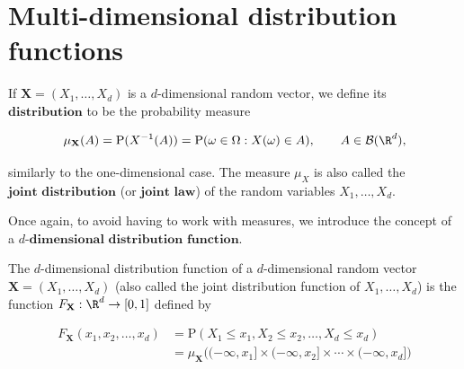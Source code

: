 \section{Multi-dimensional distribution functions}

If $\mathbf{X}=(X_1,\ldots,X_d)$ is a $d$-dimensional
random vector, we define its $\textbf{distribution}$
to be the probability measure

\[
\mu_{\mathbf{X}}(A) = \mathrm{P}(X^{-1}(A)) = \mathrm{P}(\omega \in \Omega : X(\omega) \in A),
\qquad A \in {\cal B}(\R^d),
\]

\noindent similarly to the one-dimensional case. The measure
$\mu_X$ is also called the
$\textbf{joint distribution}$ (or
$\textbf{joint law}$) of the random variables
$X_1,\ldots,X_d$.

Once again, to avoid having to work with measures, we
introduce the concept of a $\textbf{$d
$-dimensional distribution function}$.

\begin{defn}
The $d$-dimensional distribution function of a
$d$-dimensional random vector
$\mathbf{X}=(X_1,\ldots,X_d)$ (also called the joint
distribution function of $X_1,\ldots,X_d$) is the
function $F_{\mathbf{X}}:\R^d\to[0,1]$ defined by

\begin{align*}
F_{\mathbf{X}}(x_1,x_2,\ldots,x_d)
&= \mathrm{P}( X_1 \le x_1, X_2 \le x_2, \ldots, X_d \le x_d) \\
&= \mu_{\mathbf{X}}\Big( (-\infty,x_1] \times (-\infty,x_2] \times \cdots \times (-\infty,x_d] \Big)
\end{align*}

\end{defn}

